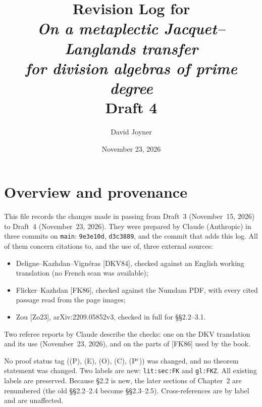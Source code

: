 \documentclass[12pt,letterpaper]{amsart}
\title[Draft 4 Revision Log]{Revision Log for\\\emph{On a metaplectic Jacquet--Langlands transfer\\for division algebras of prime degree}\\[0.5em]\normalsize Draft 4}
\author{David Joyner}
\date{November 23, 2026}
\begin{document}
\maketitle

\section{Overview and provenance}
This file records the changes made in passing from Draft~3 (November~15, 2026) to Draft~4 (November~23, 2026). They were prepared by Claude (Anthropic) in three commits on \texttt{main}: \texttt{9e3e10d}, \texttt{d3c3889}, and the commit that adds this log. All of them concern citations to, and the use of, three external sources:
\begin{itemize}[leftmargin=*]
\item Deligne--Kazhdan--Vign\'eras [DKV84], checked against an English working translation (no French scan was available);
\item Flicker--Kazhdan [FK86], checked against the Numdam PDF, with every cited passage read from the page images;
\item Zou [Zo23], arXiv:2209.05852v3, checked in full for \S\S2.2--3.1.
\end{itemize}
Two referee reports by Claude describe the checks: one on the DKV translation and its use (November~23, 2026), and  on the parts of [FK86] used by the book.

No proof status tag ((P), (E), (O), (C), (P$^{\mathrm c}$)) was changed, and no theorem statement was changed. Two labels are new: \texttt{lit:sec:FK} and \texttt{gl:FKZ}. All existing labels are preserved. Because \S2.2 is new, the later sections of Chapter~2 are renumbered (the old \S\S2.2--2.4 become \S\S2.3--2.5). Cross-references are by label and are unaffected.
\end{document}
